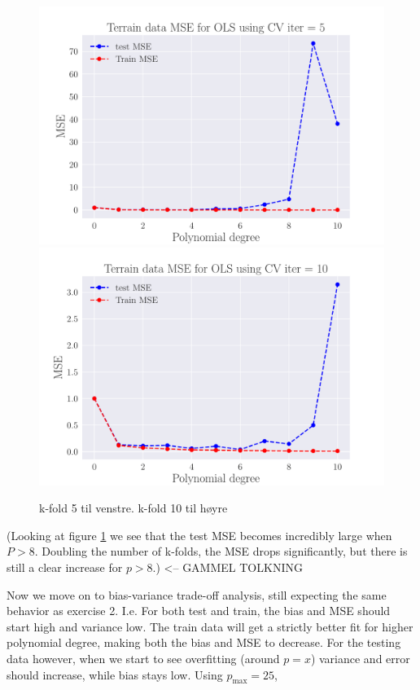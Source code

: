 \documentclass[reprint,english,notitlepage,aps,nobalancelastpage,nofootinbib]{revtex4-1}  %
\begin{document}
\begin{figure}[H]
	\includegraphics[width=\linewidth]{SRTM_MSE_OLS_n50_pol10_CV_re5.pdf}
	\endminipage\hfill
	\includegraphics[width=\linewidth]{SRTM_MSE_OLS_n50_pol10_CV_re10.pdf}
	\endminipage
	\caption{k-fold 5 til venstre. k-fold 10 til høyre}
  \label{fig:terrain_OLS_MSE_CV}
\end{figure}
(Looking at figure \ref{fig:terrain_OLS_MSE_CV} we see that the test MSE becomes incredibly large when $P>8$. Doubling the number of k-folds, the MSE drops significantly, but there is still a clear increase for $p>8$.) <-- GAMMEL TOLKNING

Now we move on to bias-variance trade-off analysis, still expecting the same behavior as exercise 2. I.e. For both test and train, the bias and MSE should start high and variance low. The train data will get a strictly better fit for higher polynomial degree, making both the bias and MSE to decrease. For the testing data however, when we start to see overfitting (around $p=x$) variance and error should increase, while bias stays low. Using $p_\text{max}=25$, 
\end{document}
